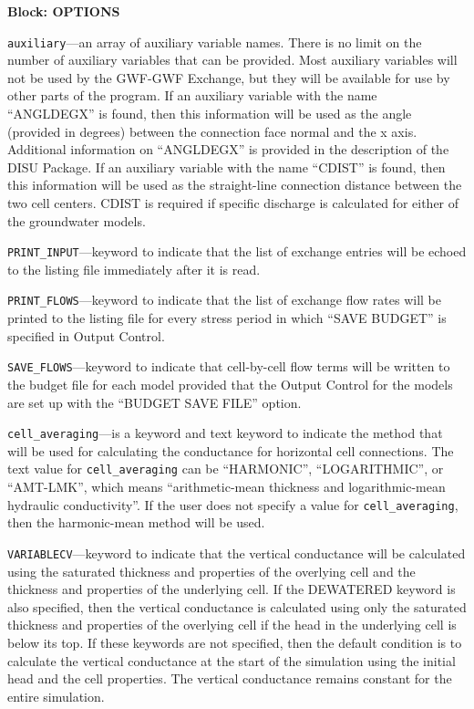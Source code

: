 
\item \textbf{Block: OPTIONS}

\begin{description}
\item \texttt{auxiliary}---an array of auxiliary variable names.  There is no limit on the number of auxiliary variables that can be provided. Most auxiliary variables will not be used by the GWF-GWF Exchange, but they will be available for use by other parts of the program.  If an auxiliary variable with the name ``ANGLDEGX'' is found, then this information will be used as the angle (provided in degrees) between the connection face normal and the x axis.  Additional information on ``ANGLDEGX'' is provided in the description of the DISU Package.  If an auxiliary variable with the name ``CDIST'' is found, then this information will be used as the straight-line connection distance between the two cell centers.  CDIST is required if specific discharge is calculated for either of the groundwater models.

\item \texttt{PRINT\_INPUT}---keyword to indicate that the list of exchange entries will be echoed to the listing file immediately after it is read.

\item \texttt{PRINT\_FLOWS}---keyword to indicate that the list of exchange flow rates will be printed to the listing file for every stress period in which ``SAVE BUDGET'' is specified in Output Control.

\item \texttt{SAVE\_FLOWS}---keyword to indicate that cell-by-cell flow terms will be written to the budget file for each model provided that the Output Control for the models are set up with the ``BUDGET SAVE FILE'' option.

\item \texttt{cell\_averaging}---is a keyword and text keyword to indicate the method that will be used for calculating the conductance for horizontal cell connections.  The text value for \texttt{cell\_averaging} can be ``HARMONIC'', ``LOGARITHMIC'', or ``AMT-LMK'', which means ``arithmetic-mean thickness and logarithmic-mean hydraulic conductivity''. If the user does not specify a value for \texttt{cell\_averaging}, then the harmonic-mean method will be used.

\item \texttt{VARIABLECV}---keyword to indicate that the vertical conductance will be calculated using the saturated thickness and properties of the overlying cell and the thickness and properties of the underlying cell.  If the DEWATERED keyword is also specified, then the vertical conductance is calculated using only the saturated thickness and properties of the overlying cell if the head in the underlying cell is below its top.  If these keywords are not specified, then the default condition is to calculate the vertical conductance at the start of the simulation using the initial head and the cell properties.  The vertical conductance remains constant for the entire simulation.


\end{description}
